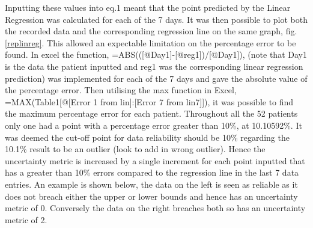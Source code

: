 \documentclass[11pt]{article}
\begin{document}
Inputting these values into eq.1 meant that the point predicted by the Linear Regression was calculated for each of the 7 days. It was then possible to plot both the recorded data and the corresponding regression line on the same graph, fig.\ref{replinreg}. This allowed an expectable limitation on the percentage error to be found. In excel the function, =ABS(([@Day1]-[@reg1])/[@Day1]), (note that Day1 is the data the patient inputted and reg1 was the corresponding linear regression prediction) was implemented for each of the 7 days and gave the absolute value of the percentage error. Then utilising the max function in Excel, =MAX(Table1[@[Error 1 from lin]:[Error 7 from lin7]]), it was possible to find the maximum percentage error for each patient. Throughout all the 52 patients only one had a point with a percentage error greater than 10\%, at 10.10592\%. It was deemed the cut-off point for data reliability should be 10\% regarding the 10.1\% result to be an outlier (look to add in wrong outlier). Hence the uncertainty metric is increased by a single increment for each point inputted that has a greater than 10\% errors compared to the regression line in the last 7 data entries. An example is shown below, the data on the left is seen as reliable as it does not breach either the upper or lower bounds and hence has an uncertainty metric of 0. Conversely the data on the right breaches both so has an uncertainty metric of 2. 
\end{document}
